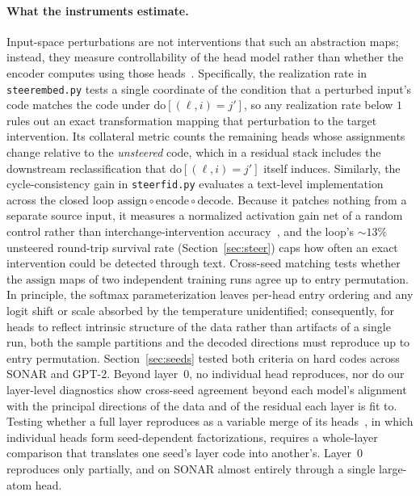 \paragraph{What the instruments estimate.}
Input-space perturbations are not interventions that such an abstraction
maps; instead, they measure controllability of the head model rather than
whether the encoder computes using those
heads~\cite[Sec.~3.7]{geiger2025}. Specifically, the realization rate in
\texttt{steerembed.py} tests a single coordinate of the condition that a
perturbed input's code matches the code under
$\mathrm{do}[(\ell,i){=}j']$, so any realization rate below $1$ rules out
an exact transformation mapping that perturbation to the target
intervention. Its collateral metric counts the remaining heads whose
assignments change relative to the \emph{unsteered} code, which in a
residual stack includes the downstream reclassification that
$\mathrm{do}[(\ell,i){=}j']$ itself induces. Similarly, the
cycle-consistency gain in \texttt{steerfid.py} evaluates a text-level
implementation across the closed loop $\mathrm{assign} \circ
\mathrm{encode} \circ \mathrm{decode}$. Because it patches nothing from a
separate source input, it measures a normalized activation gain net of a
random control rather than interchange-intervention
accuracy~\cite{geiger2022}, and the loop's ${\sim}13\%$ unsteered
round-trip survival rate (Section~\ref{sec:steer}) caps how often an
exact intervention could be detected through text. Cross-seed matching
tests whether the $\mathrm{assign}$ maps of two independent training runs
agree up to entry permutation. In principle, the softmax parameterization
leaves per-head entry ordering and any logit shift or scale absorbed by
the temperature unidentified; consequently, for heads to reflect
intrinsic structure of the data rather than artifacts of a single run,
both the sample partitions and the decoded directions must reproduce up
to entry permutation. Section~\ref{sec:seeds} tested both criteria on
hard codes across SONAR and GPT-2. Beyond layer~0, no individual head
reproduces, nor do our layer-level diagnostics show cross-seed agreement
beyond each model's alignment with the principal directions of the data
and of the residual each layer is fit to. Testing whether a full layer reproduces as a variable merge of its
heads~\cite[Def.~37]{geiger2025}, in which individual heads form
seed-dependent factorizations, requires a whole-layer comparison that
translates one seed's layer code into another's. Layer~0 reproduces only
partially, and on SONAR almost entirely through a single large-atom head.

